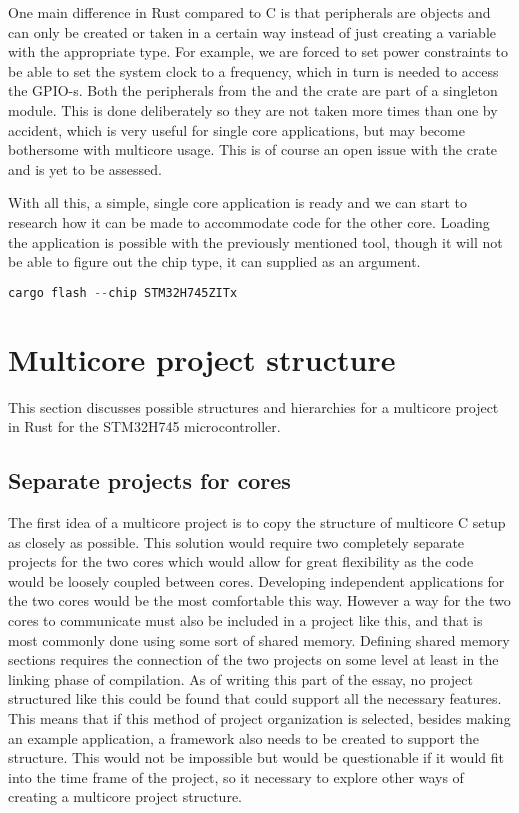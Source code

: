 One main difference in Rust compared to C is that peripherals are objects and can only be created or taken in a certain way instead of just creating a variable with the appropriate type. For example, we are forced to set power constraints to be able to set the system clock to a frequency, which in turn is needed to access the GPIO-s. Both the peripherals from the  and the  crate are part of a singleton module. This is done deliberately so they are not taken more times than one by accident, which is very useful for single core applications, but may become bothersome with multicore usage. This is of course an open issue with the  crate and is yet to be assessed. \cite{MulticorePeripherals}

With all this, a simple, single core application is ready and we can start to research how it can be made to accommodate code for the other core. Loading the application is possible with the previously mentioned  tool, though it will not be able to figure out the chip type, it can supplied as an argument.

\begin{lstlisting}[language=C,frame=single,float=!ht,label={lst:cargo-flash-1},caption={Flashing the Image with Cargo Flash}]
    cargo flash --chip STM32H745ZITx
\end{lstlisting}

\section{Multicore project structure}

This section discusses possible structures and hierarchies for a multicore project in Rust for the STM32H745 microcontroller.

\subsection{Separate projects for cores}

The first idea of a multicore project is to copy the structure of multicore C setup as closely as possible. This solution would require two completely separate projects for the two cores which would allow for great flexibility as the code would be loosely coupled between cores. Developing independent applications for the two cores would be the most comfortable this way. However a way for the two cores to communicate must also be included in a project like this, and that is most commonly done using some sort of shared memory. Defining shared memory sections requires the connection of the two projects on some level at least in the linking phase of compilation. As of writing this part of the essay, no project structured like this could be found that could support all the necessary features. This means that if this method of project organization is selected, besides making an example application, a framework also needs to be created to support the structure. This would not be impossible but would be questionable if it would fit into the time frame of the project, so it necessary to explore other ways of creating a multicore project structure.

